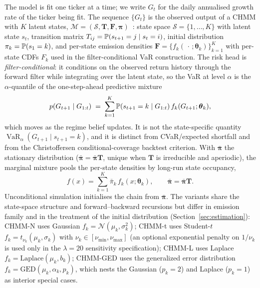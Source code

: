 The model is fit one ticker at a time; we write $G_t$ for the daily annualised growth rate of the ticker being fit. The sequence $\{G_t\}$ is the observed output of a CHMM with $K$ latent states, $\mathcal{M} = (\mathcal{S}, \mathbf{T}, \mathbf{F}, \boldsymbol{\pi})$~\cite{rabiner1986introduction}: state space $\mathcal{S} = \{1, \ldots, K\}$ with latent state $s_t$, transition matrix $T_{ij} = \mathbb{P}(s_{t+1} = j \mid s_t = i)$, initial distribution $\pi_k = \mathbb{P}(s_1 = k)$, and per-state emission densities $\mathbf{F} = \{f_k(\,\cdot\,;\boldsymbol\theta_k)\}_{k=1}^K$ with per-state CDFs $F_k$ used in the filter-conditional VaR construction. The risk head is \emph{filter-conditional}: it conditions on the observed return history through the forward filter while integrating over the latent state, so the VaR at level $\alpha$ is the $\alpha$-quantile of the one-step-ahead predictive mixture
\begin{equation}
    p(G_{t+1} \mid G_{1:t}) \;=\; \sum_{k=1}^{K} \mathbb{P}(s_{t+1} = k \mid G_{1:t})\, f_k(G_{t+1}; \boldsymbol\theta_k),
    \label{eq:filter_var}
\end{equation}
which moves as the regime belief updates. It is not the state-specific quantity $\operatorname{VaR}_\alpha(G_{t+1} \mid s_{t+1} = k)$, and it is distinct from CVaR/expected shortfall and from the Christoffersen conditional-coverage backtest criterion. With $\bar{\boldsymbol\pi}$ the stationary distribution ($\bar{\boldsymbol{\pi}} = \bar{\boldsymbol{\pi}}\mathbf{T}$, unique when $\mathbf{T}$ is irreducible and aperiodic), the marginal mixture pools the per-state densities by long-run state occupancy,
\begin{equation}
    f(x) = \sum_{k=1}^{K} \bar{\pi}_k\, f_k(x; \boldsymbol\theta_k), \qquad \bar{\boldsymbol{\pi}} = \bar{\boldsymbol{\pi}} \mathbf{T}.
    \label{eq:mixture}
\end{equation}
Unconditional simulation initialises the chain from $\bar{\boldsymbol\pi}$. The variants share the state-space structure and forward--backward recursions but differ in emission family and in the treatment of the initial distribution (Section~\ref{sec:estimation}): CHMM-N uses Gaussian $f_k = \mathcal{N}(\mu_k, \sigma_k^2)$; CHMM-t uses Student-$t$ $f_k = t_{\nu_k}(\mu_k, \sigma_k)$ with $\nu_k \in [\nu_{\min}, \nu_{\max}]$ (an optional exponential penalty on $1/\nu_k$ is used only in the $\lambda = 20$ sensitivity specification); CHMM-L uses Laplace $f_k = \mathrm{Laplace}(\mu_k, b_k)$; CHMM-GED uses the generalized error distribution $f_k = \mathrm{GED}(\mu_k, \alpha_k, p_k)$, which nests the Gaussian ($p_k = 2$) and Laplace ($p_k = 1$) as interior special cases.

